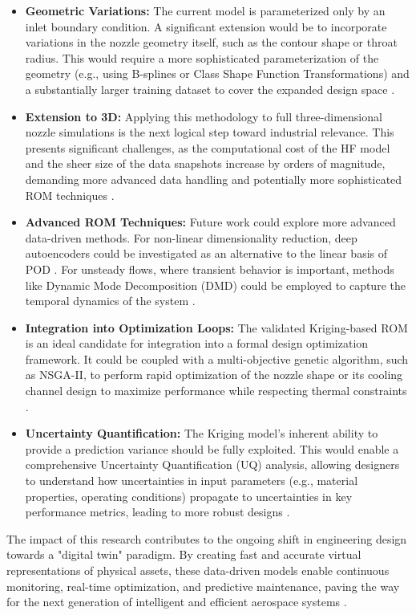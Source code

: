 \documentclass[tg, EN]{ufabcFHZh_tg}
\begin{document}
\begin{itemize}
    \item \textbf{Geometric Variations:} The current model is parameterized only by an inlet boundary condition. A significant extension would be to incorporate variations in the nozzle geometry itself, such as the contour shape or throat radius. This would require a more sophisticated parameterization of the geometry (e.g., using B-splines or Class Shape Function Transformations) and a substantially larger training dataset to cover the expanded design space \citep{bekemeyer2025, samareh2001}.
    \item \textbf{Extension to 3D:} Applying this methodology to full three-dimensional nozzle simulations is the next logical step toward industrial relevance. This presents significant challenges, as the computational cost of the HF model and the sheer size of the data snapshots increase by orders of magnitude, demanding more advanced data handling and potentially more sophisticated ROM techniques \citep{carlberg2018}.
    \item \textbf{Advanced ROM Techniques:} Future work could explore more advanced data-driven methods. For non-linear dimensionality reduction, deep autoencoders could be investigated as an alternative to the linear basis of POD \citep{erichson2020, kutz2017}. For unsteady flows, where transient behavior is important, methods like Dynamic Mode Decomposition (DMD) could be employed to capture the temporal dynamics of the system \citep{hesthaven2016, rowley2017}.
    \item \textbf{Integration into Optimization Loops:} The validated Kriging-based ROM is an ideal candidate for integration into a formal design optimization framework. It could be coupled with a multi-objective genetic algorithm, such as NSGA-II, to perform rapid optimization of the nozzle shape or its cooling channel design to maximize performance while respecting thermal constraints \citep{deb2002}.
    \item \textbf{Uncertainty Quantification:} The Kriging model's inherent ability to provide a prediction variance should be fully exploited. This would enable a comprehensive Uncertainty Quantification (UQ) analysis, allowing designers to understand how uncertainties in input parameters (e.g., material properties, operating conditions) propagate to uncertainties in key performance metrics, leading to more robust designs \citep{yu2019, ng2018, lemaitre2010}.
\end{itemize}

The impact of this research contributes to the ongoing shift in engineering design towards a "digital twin" paradigm. By creating fast and accurate virtual representations of physical assets, these data-driven models enable continuous monitoring, real-time optimization, and predictive maintenance, paving the way for the next generation of intelligent and efficient aerospace systems \citep{glaessgen2012digital, rasheed2020}.



\newpage


\end{document}
